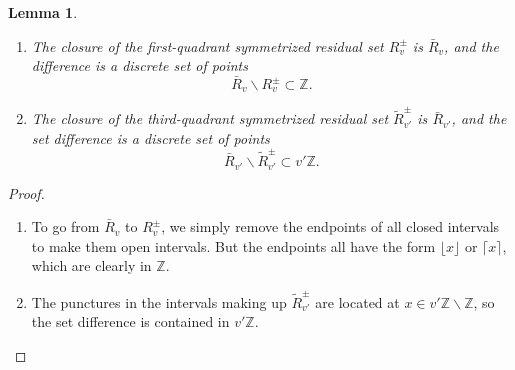\documentclass[12pt,letterpaper, reqno]{amsart}
\newtheorem{lem}[thm]{Lemma}
\theoremstyle{definition}
\theoremstyle{remark}
\newcommand{\ZZ}{\ensuremath{\mathbb{Z}}}
\newcommand{\vv}{{v'}}
\newcommand{\floor}[1]{\lfloor{#1}\rfloor}
\newcommand{\ceil}[1]{\lceil{#1}\rceil}
\begin{document}
\begin{lem}\label{closed-residue-set}
\begin{enumerate}
\item The closure of the first-quadrant symmetrized residual set $R_v^\pm$ is $\bar{R}_v$, and the difference
is a discrete set of points
\[ \bar{R}_v \smallsetminus R_v^\pm \subset \ZZ .\]
\item The closure of the third-quadrant symmetrized residual set $\widetilde{R}_{\vv}^\pm$ is $\bar{R}_{\vv}$, and the set difference is a discrete set of points
\[ \bar{R}_{\vv} \smallsetminus \widetilde{R}_{\vv}^\pm \subset \vv\ZZ . \]
\end{enumerate}
\end{lem}
\begin{proof}
\begin{enumerate}
\item To go from $\bar{R}_v$ to $R_v^\pm$, we simply remove the endpoints of all closed intervals to make them open intervals. But the endpoints all have the form $\floor{x}$ or $\ceil{x}$, which are clearly in $\ZZ$.

\item The punctures in the intervals making up $\widetilde{R}_{\vv}^\pm$ are located at $x\in \vv\ZZ\smallsetminus\ZZ$, so the set difference is contained in $\vv\ZZ$.
\end{enumerate}
\end{proof}
\end{document}
